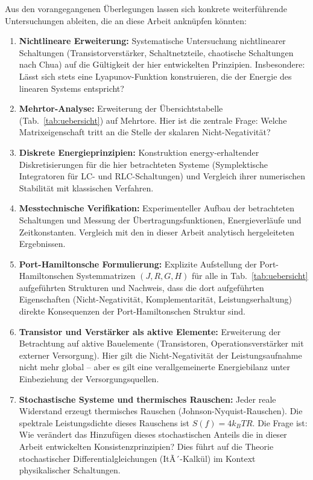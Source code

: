﻿\documentclass[12pt, a4paper]{article}
\begin{document}
	Aus den vorangegangenen Überlegungen lassen sich konkrete weiterführende Untersuchungen ableiten, die an diese Arbeit anknüpfen könnten:

	\begin{enumerate}
		\item \textbf{Nichtlineare Erweiterung:} Systematische Untersuchung nichtlinearer Schaltungen (Transistorverstärker, Schaltnetzteile, chaotische Schaltungen nach Chua) auf die Gültigkeit der hier entwickelten Prinzipien. Insbesondere: Lässt sich stets eine Lyapunov-Funktion konstruieren, die der Energie des linearen Systems entspricht?

		\item \textbf{Mehrtor-Analyse:} Erweiterung der Übersichtstabelle (Tab.~\ref{tab:uebersicht}) auf Mehrtore. Hier ist die zentrale Frage: Welche Matrixeigenschaft tritt an die Stelle der skalaren Nicht-Negativität?

		\item \textbf{Diskrete Energieprinzipien:} Konstruktion energy-erhaltender Diskretisierungen für die hier betrachteten Systeme (Symplektische Integratoren für LC- und RLC-Schaltungen) und Vergleich ihrer numerischen Stabilität mit klassischen Verfahren.

		\item \textbf{Messtechnische Verifikation:} Experimenteller Aufbau der betrachteten Schaltungen und Messung der Übertragungsfunktionen, Energieverläufe und Zeitkonstanten. Vergleich mit den in dieser Arbeit analytisch hergeleiteten Ergebnissen.

		\item \textbf{Port-Hamiltonsche Formulierung:} Explizite Aufstellung der Port-Hamiltonschen Systemmatrizen $(J, R, G, H)$ für alle in Tab.~\ref{tab:uebersicht} aufgeführten Strukturen und Nachweis, dass die dort aufgeführten Eigenschaften (Nicht-Negativität, Komplementarität, Leistungserhaltung) direkte Konsequenzen der Port-Hamiltonschen Struktur sind.

		\item \textbf{Transistor und Verstärker als aktive Elemente:} Erweiterung der Betrachtung auf aktive Bauelemente (Transistoren, Operationsverstärker mit externer Versorgung). Hier gilt die Nicht-Negativität der Leistungsaufnahme nicht mehr global -- aber es gilt eine verallgemeinerte Energiebilanz unter Einbeziehung der Versorgungsquellen.

		\item \textbf{Stochastische Systeme und thermisches Rauschen:} Jeder reale Widerstand erzeugt thermisches Rauschen (Johnson-Nyquist-Rauschen). Die spektrale Leistungsdichte dieses Rauschens ist $S(f) = 4k_BT R$. Die Frage ist: Wie verändert das Hinzufügen dieses stochastischen Anteils die in dieser Arbeit entwickelten Konsistenzprinzipien? Dies führt auf die Theorie stochastischer Differentialgleichungen (ItÃ´-Kalkül) im Kontext physikalischer Schaltungen.
	\end{enumerate}
\end{document}
